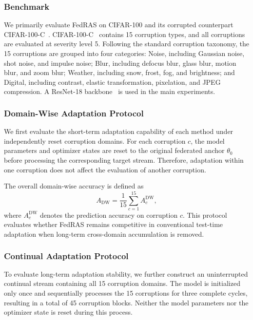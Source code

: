 \documentclass[journal]{IEEEtran}
\begin{document}
\subsubsection{Benchmark}
We primarily evaluate FedRAS on CIFAR-100 and its corrupted counterpart CIFAR-100-C~\cite{3}. CIFAR-100-C~\cite{3} contains 15 corruption types, and all corruptions are evaluated at severity level 5. Following the standard corruption taxonomy, the 15 corruptions are grouped into four categories: Noise, including Gaussian noise, shot noise, and impulse noise; Blur, including defocus blur, glass blur, motion blur, and zoom blur; Weather, including snow, frost, fog, and brightness; and Digital, including contrast, elastic transformation, pixelation, and JPEG compression. A ResNet-18 backbone~\cite{3} is used in the main experiments.

\subsubsection{Domain-Wise Adaptation Protocol}
We first evaluate the short-term adaptation capability of each method under independently reset corruption domains. For each corruption $c$, the model parameters and optimizer states are reset to the original federated anchor $\theta_0$ before processing the corresponding target stream. Therefore, adaptation within one corruption does not affect the evaluation of another corruption.

The overall domain-wise accuracy is defined as
\begin{equation}
A_{\mathrm{DW}} = \frac{1}{15} \sum_{c=1}^{15} A_c^{\mathrm{DW}},
\end{equation}
where $A_c^{\mathrm{DW}}$ denotes the prediction accuracy on corruption $c$. This protocol evaluates whether FedRAS remains competitive in conventional test-time adaptation when long-term cross-domain accumulation is removed.

\subsubsection{Continual Adaptation Protocol}
To evaluate long-term adaptation stability, we further construct an uninterrupted continual stream containing all 15 corruption domains. The model is initialized only once and sequentially processes the 15 corruptions for three complete cycles, resulting in a total of 45 corruption blocks. Neither the model parameters nor the optimizer state is reset during this process.
\end{document}
